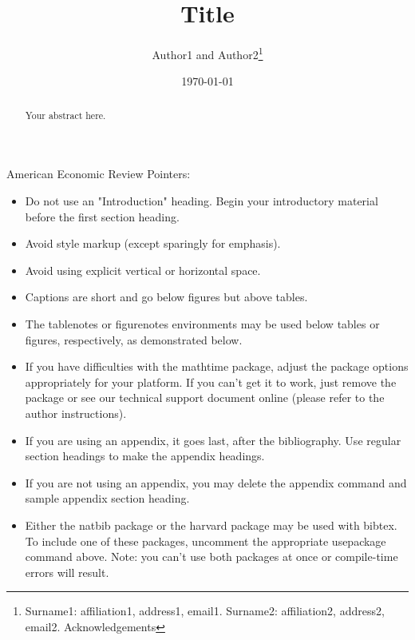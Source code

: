 \documentclass[AER]{AEA}
\begin{document}
	
	\title{Title}
	\author{Author1 and Author2\thanks{Surname1: affiliation1, address1, email1. 
			Surname2: affiliation2, address2, email2. Acknowledgements}}
	\date{\today}
	\JEL{}
	\Keywords{}
	
	\begin{abstract}
		Your abstract here.
	\end{abstract}
	
	
	\maketitle
	
	American Economic Review Pointers:
	
	\begin{itemize}
		\item Do not use an "Introduction" heading. Begin your introductory material
		before the first section heading.
		
		\item Avoid style markup (except sparingly for emphasis).
		
		\item Avoid using explicit vertical or horizontal space.
		
		\item Captions are short and go below figures but above tables.
		
		\item The tablenotes or figurenotes environments may be used below tables
		or figures, respectively, as demonstrated below.
		
		\item If you have difficulties with the mathtime package, adjust the package
		options appropriately for your platform. If you can't get it to work, just
		remove the package or see our technical support document online (please
		refer to the author instructions).
		
		\item If you are using an appendix, it goes last, after the bibliography.
		Use regular section headings to make the appendix headings.
		
		\item If you are not using an appendix, you may delete the appendix command
		and sample appendix section heading.
		
		\item Either the natbib package or the harvard package may be used with bibtex.
		To include one of these packages, uncomment the appropriate usepackage command
		above. Note: you can't use both packages at once or compile-time errors will result.
		
	\end{itemize}
	
\end{document}
